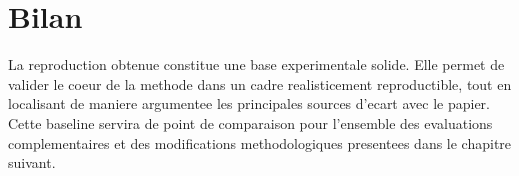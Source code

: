 \section{Bilan}

La reproduction obtenue constitue une base experimentale solide. Elle permet de
valider le coeur de la methode dans un cadre realisticement reproductible, tout
en localisant de maniere argumentee les principales sources d'ecart avec le
papier. Cette baseline servira de point de comparaison pour l'ensemble des
evaluations complementaires et des modifications methodologiques presentees
dans le chapitre suivant.
